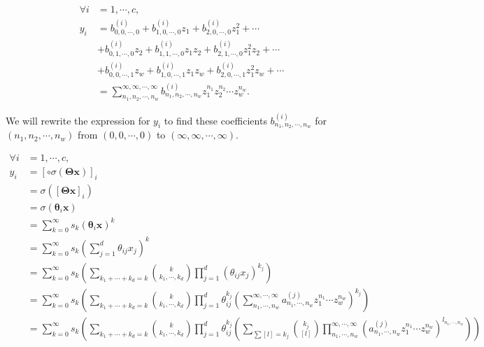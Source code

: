 \documentclass{article}
\begin{document}
\begin{align*}
    \forall i &= 1, \cdots, c, \\ y_i
    &= b^{(i)}_{0,0,\cdots,0} + b^{(i)}_{1,0,\cdots,0} z_1 + b^{(i)}_{2,0,\cdots,0} z_1^2 + \cdots \\
    &+ b^{(i)}_{0,1,\cdots,0} z_2 + b^{(i)}_{1,1,\cdots,0} z_1 z_2 + b^{(i)}_{2,1,\cdots,0} z_1^2 z_2 + \cdots \\
    &+ b^{(i)}_{0,0,\cdots,1} z_w + b^{(i)}_{1,0,\cdots,1} z_1 z_w + b^{(i)}_{2,0,\cdots,1} z_1^2 z_w + \cdots \\
    &= \sum_{n_1,n_2,\cdots,n_w}^{\infty,\infty,\cdots,\infty} b^{(i)}_{n_1,n_2,\cdots,n_w} z_1^{n_1} z_2^{n_2} \cdots z_w^{n_w}.
\end{align*}

\noindent
We will rewrite the expression for $y_i$ to find these coefficients $b^{(i)}_{n_1, n_2, \cdots, n_w}$ for $(n_1, n_2, \cdots, n_w)$ from $(0, 0, \cdots, 0)$ to $(\infty, \infty, \cdots, \infty)$.

\begin{align*}
    \forall i &= 1, \cdots, c, \\ y_i
    &= \left[\circ\sigma(\mathbf{\Theta} \mathbf{x})\right]_i \\
    &= \sigma(\left[\mathbf{\Theta} \mathbf{x}\right]_i) \\
    &= \sigma(\mathbf{\theta}_i \mathbf{x}) \\
    &= \sum_{k=0}^{\infty} s_k (\mathbf{\theta}_i \mathbf{x})^k \\
    &= \sum_{k=0}^{\infty} s_k \left(\sum_{j=1}^{d} \theta_{ij} x_{j}\right)^k \\
    &= \sum_{k=0}^{\infty} s_k \left(\sum_{k_1 + \cdots + k_d = k} \binom{k}{k_1, \cdots, k_d} \prod_{j=1}^{d} (\theta_{ij} x_j)^{k_j} \right) \\
    &= \sum_{k=0}^{\infty} s_k \left(\sum_{k_1 + \cdots + k_d = k} \binom{k}{k_1, \cdots, k_d} \prod_{j=1}^{d}\theta_{ij}^{k_j} \left(\sum_{n_1, \cdots, n_w}^{\infty,
    \cdots, \infty} a^{(j)}_{n_1,\cdots,n_w} z_1^{n_1}  \cdots z_w^{n_w} \right)^{k_j}\right) \\
    &= \sum_{k=0}^{\infty} s_k \left(\sum_{k_1 + \cdots + k_d = k} \binom{k}{k_1, \cdots, k_d} \prod_{j=1}^{d} \theta_{ij}^{k_j} \left(\sum_{\sum [l] = k_j} \binom{k_j}{[l]} \prod_{n_1, \cdots, n_w}^{\infty, \cdots, \infty} (a^{(j)}_{n_1, \cdots, n_w} z_1^{n_1} \cdots z_w^{n_w})^{l_{n_1, \cdots, n_w}} \right)\right)
\end{align*}
\end{document}
